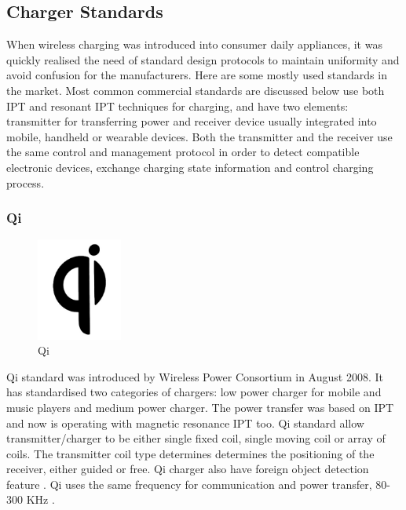 \documentclass[12pt,a4paper,UKenglish]{report}
\begin{document}
\subsection{Charger Standards}
When wireless charging was introduced into consumer daily appliances, it was quickly realised the need of 
standard design protocols to maintain uniformity and avoid confusion for the manufacturers. Here are some 
mostly used standards in the market. Most common commercial standards are discussed below use both IPT and resonant IPT 
techniques for charging, and have two elements: transmitter for transferring power and receiver device usually 
integrated into mobile, handheld or wearable devices. Both the transmitter and the receiver use the same control 
and management protocol in order to detect compatible electronic devices, exchange charging state information 
and control charging process. \\

\subsubsection{Qi}
\begin{figure}
  \vspace{-5pt}
  \centering
    \includegraphics[width=0.25\textwidth]{img/logo_qi.jpg}
  \vspace{-5pt}
  \caption{Qi}
  \vspace{-5pt}
\end{figure}

Qi standard was introduced by Wireless Power Consortium in August 2008. It has standardised two categories of 
chargers: low power charger for mobile and music players and medium power charger. The power transfer was based 
on IPT and now is operating with magnetic resonance IPT too. Qi standard allow transmitter/charger to be either 
single fixed coil, single moving coil or array of coils. The transmitter coil type determines determines the 
positioning of the receiver, either guided or free. Qi charger also have foreign object detection feature 
\cite{wpt_qi}. Qi uses the same frequency for communication and power transfer, 80-300 KHz \cite{wpt_qi_ian}. \\
\end{document}
